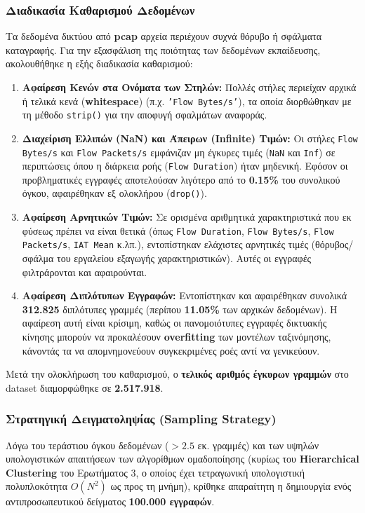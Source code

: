 \documentclass[11pt,a4paper]{article}
\newcommand{\eng}[1]{\textlatin{#1}}
\begin{document}
\subsubsection{Διαδικασία Καθαρισμού Δεδομένων}
Τα δεδομένα δικτύου από \textbf{\eng{pcap}} αρχεία περιέχουν συχνά θόρυβο ή σφάλματα καταγραφής. Για την εξασφάλιση της ποιότητας των δεδομένων εκπαίδευσης, ακολουθήθηκε η εξής διαδικασία καθαρισμού:
\begin{enumerate}
    \item \textbf{Αφαίρεση Κενών στα Ονόματα των Στηλών:} Πολλές στήλες περιείχαν αρχικά ή τελικά κενά (\textbf{\eng{whitespace}}) (π.χ. \texttt{'\eng{Flow Bytes/s}'}), τα οποία διορθώθηκαν με τη μέθοδο \texttt{\eng{strip()}} για την αποφυγή σφαλμάτων αναφοράς.
    \item \textbf{Διαχείριση Ελλιπών (\eng{NaN}) και Άπειρων (\eng{Infinite}) Τιμών:} 
    Οι στήλες \texttt{\eng{Flow Bytes/s}} και \texttt{\eng{Flow Packets/s}} εμφάνιζαν μη έγκυρες τιμές (\texttt{\eng{NaN}} και \texttt{\eng{Inf}}) σε περιπτώσεις όπου η διάρκεια ροής (\texttt{\eng{Flow Duration}}) ήταν μηδενική. Εφόσον οι προβληματικές εγγραφές αποτελούσαν λιγότερο από το \textbf{0.15\%} του συνολικού όγκου, αφαιρέθηκαν εξ ολοκλήρου (\texttt{\eng{drop()}}).
    \item \textbf{Αφαίρεση Αρνητικών Τιμών:} Σε ορισμένα αριθμητικά χαρακτηριστικά που εκ φύσεως πρέπει να είναι θετικά (όπως \texttt{\eng{Flow Duration}}, \texttt{\eng{Flow Bytes/s}}, \texttt{\eng{Flow Packets/s}}, \texttt{\eng{IAT Mean}} κ.λπ.), εντοπίστηκαν ελάχιστες αρνητικές τιμές (θόρυβος/σφάλμα του εργαλείου εξαγωγής χαρακτηριστικών). Αυτές οι εγγραφές φιλτράρονται και αφαιρούνται.
    \item \textbf{Αφαίρεση Διπλότυπων Εγγραφών:}
    Εντοπίστηκαν και αφαιρέθηκαν συνολικά \textbf{312.825} διπλότυπες γραμμές (περίπου \textbf{11.05\%} των αρχικών δεδομένων). Η αφαίρεση αυτή είναι κρίσιμη, καθώς οι πανομοιότυπες εγγραφές δι\-κτυ\-α\-κής κίνησης μπορούν να προ\-κα\-λέ\-σουν \textbf{\eng{overfitting}} των μοντέλων τα\-ξι\-νό\-μη\-σης, κάνοντάς τα να απο\-μνη\-μο\-νεύ\-ουν συγκεκριμένες ροές αντί να γενικεύουν.
\end{enumerate}

Μετά την ολοκλήρωση του καθαρισμού, ο \textbf{τελικός αριθμός έγκυρων γραμμών} στο \eng{dataset} διαμορφώθηκε σε \textbf{2.517.918}.

\subsubsection{Στρατηγική Δειγματοληψίας (\eng{Sampling Strategy})}
Λόγω του τεράστιου όγκου δεδομένων ($>2.5$ εκ. γραμμές) και των υψηλών υπολογιστικών απαιτήσεων των αλγορίθμων ομαδοποίησης (κυρίως του \textbf{\eng{Hierarchical Clustering}} του Ερωτήματος 3, ο οποίος έχει τετραγωνική υπολογιστική πολυπλοκότητα $O(N^2)$ ως προς τη μνήμη), κρίθηκε απαραίτητη η δημιουργία ενός αντιπροσωπευτικού δείγματος \textbf{100.000 εγγραφών}.
\end{document}
